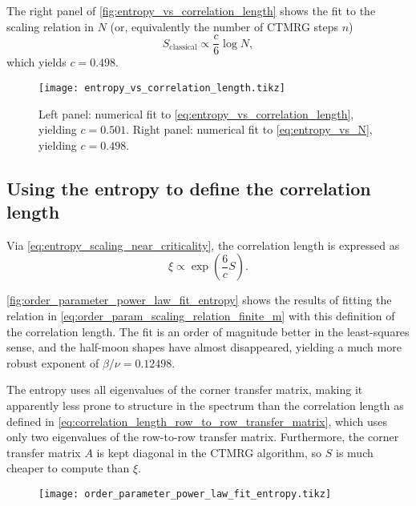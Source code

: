 The right panel of \autoref{fig:entropy_vs_correlation_length} shows the fit to the scaling relation in $N$ (or,
equivalently the number of CTMRG steps $n$)
\begin{equation}\label{eq:entropy_vs_N}
  S_{\text{classical}} \propto \frac{c}{6} \log N,
\end{equation}
which yields $c = 0.498$.

\begin{figure}
  \texttt{[image: entropy\_vs\_correlation\_length.tikz]}
  \caption{Left panel: numerical fit to \autoref{eq:entropy_vs_correlation_length}, yielding $c = 0.501$. Right panel:
  numerical fit to \autoref{eq:entropy_vs_N}, yielding $c = 0.498$. }\label{fig:entropy_vs_correlation_length}
\end{figure}

\subsection{Using the entropy to define the correlation length}\label{sec:entropy_to_define_correlation_length}
Via \autoref{eq:entropy_scaling_near_criticality}, the correlation length is expressed as
\begin{equation}\label{eq:correlation_length_as_function_of_entropy}
  \xi \propto \exp(\frac{6}{c}S).
\end{equation}

\autoref{fig:order_parameter_power_law_fit_entropy} shows the results of fitting the relation in
\autoref{eq:order_param_scaling_relation_finite_m} with this definition of the correlation length. The fit is an order
of magnitude better in the least-squares sense, and the half-moon shapes have almost disappeared,
yielding a much more robust exponent of $\beta/\nu = 0.12498$.

The entropy uses all eigenvalues of the corner transfer matrix, making it apparently less prone to structure in the
spectrum than the correlation length as defined in \autoref{eq:correlation_length_row_to_row_transfer_matrix},
which uses only two eigenvalues of the row-to-row transfer matrix.
Furthermore, the corner transfer matrix $A$ is kept diagonal in the CTMRG algorithm,
so $S$ is much cheaper to compute than $\xi$.

\begin{figure}
  \texttt{[image: order\_parameter\_power\_law\_fit\_entropy.tikz]}
  \caption{}\label{fig:order_parameter_power_law_fit_entropy}
\end{figure}

